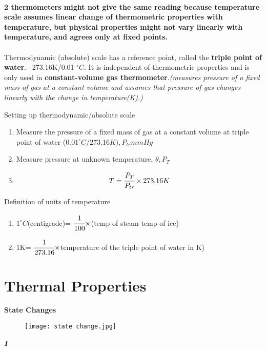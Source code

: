 \documentclass{article}
\begin{document}
\\
\textbf{2 thermometers might not give the same reading because temperature scale assumes linear change of thermometric properties with temperature, but physical properties might not vary linearly with temperature, and agrees only at fixed points.}
\\\\
Thermodynamic (absolute) scale has a reference point, called the \textbf{triple point of water}.-- 273.16K/0.01 $^\circ C$. It is independent of thermometric properties and is only used in \textbf{constant-volume gas thermometer}.\textit{(measures pressure of a fixed mass of gas at a constant volume and assumes that pressure of gas changes linearly with the change in temperature(K).)}
\begin{flushleft}
Setting up thermodynamic/absolute scale
\end{flushleft}
\begin{enumerate}
    \item Measure the pressure of a fixed mass of gas at a constant volume at triple point of water  ($0.01^\circ C/273.16K),P_{tr}mmHg$
    \item Measure pressure at unknown temperature, $\theta, P_T$
    \item $$T=\cfrac{P_T}{P_{tr}}\times273.16K$$
\end{enumerate}

\begin{flushleft}
Definition of units of temperature
\begin{enumerate}
    \item $1^\circ C$(centigrade)= $\cfrac{1}{100}\times$(temp of steam-temp of ice)
    \item 1K= $\cfrac{1}{273.16}\times$temperature of the triple point of water in K)
\end{enumerate}
\end{flushleft}


\newpage
\section{Thermal Properties}
\begin{flushleft}
 \textbf{State Changes}
\end{flushleft}

\begin{figure}[H]
    \centering
    \texttt{[image: state change.jpg]}
\end{figure}

\textbf{\textit{I}}
\end{document}
